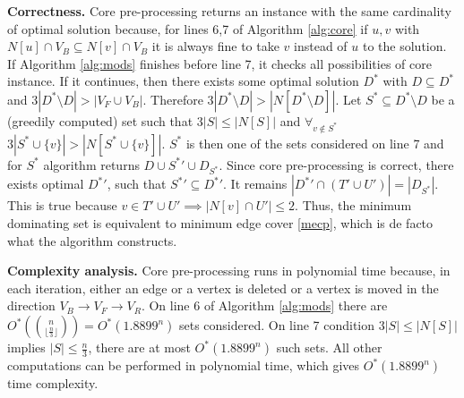 \textbf{Correctness.} Core pre-processing returns an instance with the same cardinality of optimal solution because, for lines 6,7 of Algorithm \ref{alg:core} if $u, v$ with $N[u] \cap V_B \subseteq N[v] \cap V_B$ it is always fine to take $v$ instead of $u$ to the solution. If Algorithm \ref{alg:mods} finishes before line 7, it checks all possibilities of core instance. If it continues, then there exists some optimal solution $D^*$ with $D \subseteq D^*$ and $3|D^* \setminus D| > |V_F \cup V_B|$. Therefore $3|D^* \setminus D| > |N[D^* \setminus D]|$. Let $S^* \subseteq D^* \setminus D$ be a (greedily computed) set such that $3|S| \leq |N[S]|$ and $\forall_{v\notin S^*}$ $3|S^* \cup \{v\}| > |N[S^* \cup \{v\}]|$. $S^*$ is then one of the sets considered on line 7 and for $S^*$ algorithm returns $D\cup {S^*}' \cup D_{S^*}$. Since core pre-processing is correct, there exists optimal ${D^*}'$, such that ${S^*}' \subseteq {D^*}'$. It remains $|{D^*}' \cap (T' \cup U')| = |D_{S^*}|$. This is true because $v\in T' \cup U' \implies |N[v] \cap U'| \leq 2$. Thus, the minimum dominating set is equivalent to minimum edge cover \ref{mecp}, which is de facto what the algorithm constructs.
\par\textbf{Complexity analysis.} Core pre-processing runs in polynomial time because, in each iteration, either an edge or a vertex is deleted or a vertex is moved in the direction $V_B \to V_F \to V_R$. On line 6 of Algorithm \ref{alg:mods} there are $O^*(\binom{n}{\lfloor\frac{n}{3}\rfloor}) = O^*(1.8899^n)$ sets considered. On line 7 condition $3|S| \leq |N[S]|$ implies $|S| \leq \frac{n}{3}$, there are at most $O^*(1.8899^n)$ such sets. All other computations can be performed in polynomial time, which gives $O^*(1.8899^n)$ time complexity.
